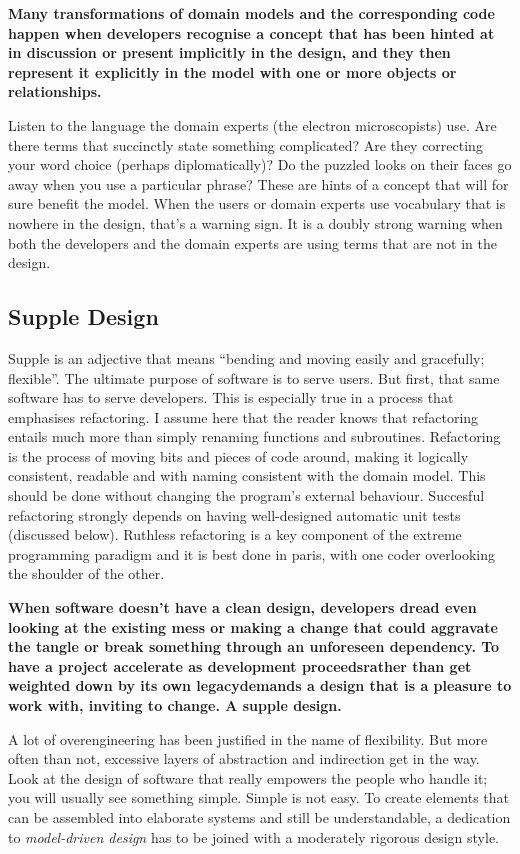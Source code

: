 \documentclass[a4paper,11pt]{article}
\begin{document}
\textbf{Many transformations of domain models and the corresponding code happen when developers recognise a concept that has been hinted at in discussion or present implicitly in the design, and they then represent it explicitly in the model with one or more objects or relationships.}

Listen to the language the domain experts (the electron microscopists) use. Are there terms that succinctly state something complicated? Are they correcting your word choice (perhaps diplomatically)? Do the puzzled looks on their faces go away when you use a particular phrase? These are hints of a concept that will for sure benefit the model. When the users or domain experts use vocabulary that is nowhere in the design, that's a warning sign. It is a doubly strong warning when both the developers and the domain experts are using terms that are not in the design.

\subsection{Supple Design}
Supple is an adjective that means ``bending and moving easily and gracefully; flexible''. The ultimate purpose of software is to serve users. But first, that same software has to serve developers. This is especially true in a process that emphasises refactoring. I assume here that the reader knows that refactoring entails much more than simply renaming functions and subroutines. Refactoring is the process of moving bits and pieces of code around, making it logically consistent, readable and with naming consistent with the domain model. This should be done without changing the program's external behaviour. Succesful refactoring strongly depends on having well-designed automatic unit tests (discussed below). Ruthless refactoring is a key component of the extreme programming paradigm and it is best done in paris, with one coder overlooking the shoulder of the other.

\textbf{When software doesn't have a clean design, developers dread even looking at the existing mess or making a change that could aggravate the tangle or break something through an unforeseen dependency. To have a project accelerate as development proceeds\textemdash{}rather than get weighted down by its own legacy\textemdash{}demands a design that is a pleasure to work with, inviting to change. A supple design.}

A lot of overengineering has been justified in the name of flexibility. But more often than not, excessive layers of abstraction and indirection get in the way. Look at the design of software that really empowers the people who handle it; you will usually see something simple. Simple is not easy. To create elements that can be assembled into elaborate systems and still be understandable, a dedication to \textit{model-driven design} has to be joined with a moderately rigorous design style.
\end{document}
